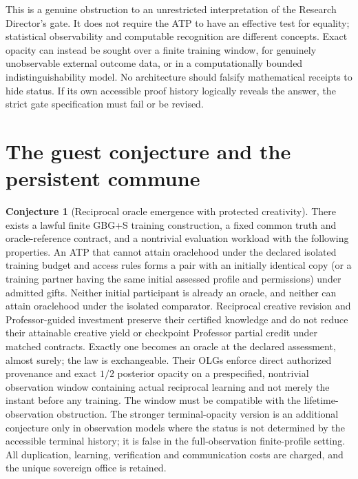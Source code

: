 \documentclass[11pt]{article}
\theoremstyle{definition}\newtheorem{definition}[theorem]{Definition}\newtheorem{conjecture}[theorem]{Conjecture}\newtheorem{example}[theorem]{Example}
\begin{document}
This is a genuine obstruction to an unrestricted interpretation of the Research Director's gate. It does not require the ATP to have an effective test for equality; statistical observability and computable recognition are different concepts. Exact opacity can instead be sought over a finite training window, for genuinely unobservable external outcome data, or in a computationally bounded indistinguishability model. No architecture should falsify mathematical receipts to hide status. If its own accessible proof history logically reveals the answer, the strict gate specification must fail or be revised.

\section{The guest conjecture and the persistent commune}
\begin{conjecture}[Reciprocal oracle emergence with protected creativity]
There exists a lawful finite GBG+S training construction, a fixed common truth and oracle-reference contract, and a nontrivial evaluation workload with the following properties. An ATP that cannot attain oraclehood under the declared isolated training budget and access rules forms a pair with an initially identical copy (or a training partner having the same initial assessed profile and permissions) under admitted gifts. Neither initial participant is already an oracle, and neither can attain oraclehood under the isolated comparator. Reciprocal creative revision and Professor-guided investment preserve their certified knowledge and do not reduce their attainable creative yield or checkpoint Professor partial credit under matched contracts. Exactly one becomes an oracle at the declared assessment, almost surely; the law is exchangeable. Their OLGs enforce direct authorized provenance and exact $1/2$ posterior opacity on a prespecified, nontrivial observation window containing actual reciprocal learning and not merely the instant before any training. The window must be compatible with the lifetime-observation obstruction. The stronger terminal-opacity version is an additional conjecture only in observation models where the status is not determined by the accessible terminal history; it is false in the full-observation finite-profile setting. All duplication, learning, verification and communication costs are charged, and the unique sovereign office is retained.
\end{conjecture}
\end{document}
